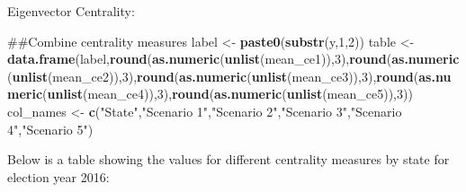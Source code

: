 \documentclass[]{article}
\newenvironment{Shaded}{\begin{snugshade}}{\end{snugshade}}
\newcommand{\KeywordTok}[1]{\textcolor[rgb]{0.13,0.29,0.53}{\textbf{#1}}}
\newcommand{\DataTypeTok}[1]{\textcolor[rgb]{0.13,0.29,0.53}{#1}}
\newcommand{\DecValTok}[1]{\textcolor[rgb]{0.00,0.00,0.81}{#1}}
\newcommand{\StringTok}[1]{\textcolor[rgb]{0.31,0.60,0.02}{#1}}
\newcommand{\OtherTok}[1]{\textcolor[rgb]{0.56,0.35,0.01}{#1}}
\newcommand{\OperatorTok}[1]{\textcolor[rgb]{0.81,0.36,0.00}{\textbf{#1}}}
\newcommand{\NormalTok}[1]{#1}
\begin{document}
Eigenvector Centrality:

\begin{Shaded}
\begin{Highlighting}[]
\NormalTok{##Combine centrality measures}
\NormalTok{label <-}\StringTok{ }\KeywordTok{paste0}\NormalTok{(}\KeywordTok{substr}\NormalTok{(y,}\DecValTok{1}\NormalTok{,}\DecValTok{2}\NormalTok{))}
\NormalTok{table <-}\StringTok{ }\KeywordTok{data.frame}\NormalTok{(label,}\KeywordTok{round}\NormalTok{(}\KeywordTok{as.numeric}\NormalTok{(}\KeywordTok{unlist}\NormalTok{(mean_ce1)),}\DecValTok{3}\NormalTok{),}\KeywordTok{round}\NormalTok{(}\KeywordTok{as.numeric}\NormalTok{(}\KeywordTok{unlist}\NormalTok{(mean_ce2)),}\DecValTok{3}\NormalTok{),}\KeywordTok{round}\NormalTok{(}\KeywordTok{as.numeric}\NormalTok{(}\KeywordTok{unlist}\NormalTok{(mean_ce3)),}\DecValTok{3}\NormalTok{),}\KeywordTok{round}\NormalTok{(}\KeywordTok{as.numeric}\NormalTok{(}\KeywordTok{unlist}\NormalTok{(mean_ce4)),}\DecValTok{3}\NormalTok{),}\KeywordTok{round}\NormalTok{(}\KeywordTok{as.numeric}\NormalTok{(}\KeywordTok{unlist}\NormalTok{(mean_ce5)),}\DecValTok{3}\NormalTok{))}
\NormalTok{col_names <-}\StringTok{ }\KeywordTok{c}\NormalTok{(}\StringTok{"State"}\NormalTok{,}\StringTok{"Scenario 1"}\NormalTok{,}\StringTok{"Scenario 2"}\NormalTok{,}\StringTok{"Scenario 3"}\NormalTok{,}\StringTok{"Scenario 4"}\NormalTok{,}\StringTok{"Scenario 5"}\NormalTok{)}
\end{Highlighting}
\end{Shaded}

Below is a table showing the values for different centrality measures by
state for election year 2016:

\begin{Shaded}
\end{Shaded}
\end{document}
